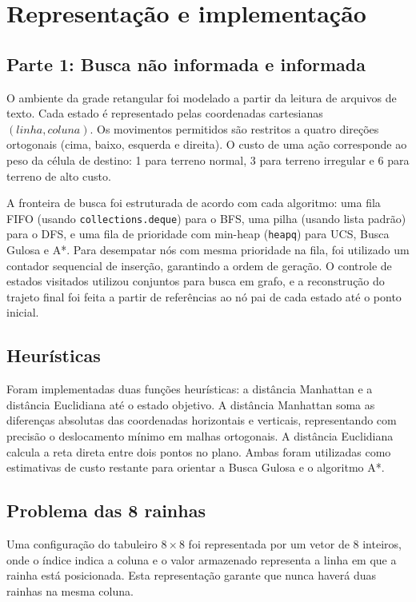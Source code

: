 \documentclass[12pt]{article}
\begin{document}
\section{Representação e implementação}

\subsection{Parte 1: Busca não informada e informada}
O ambiente da grade retangular foi modelado a partir da leitura de arquivos de texto. Cada estado é representado pelas coordenadas cartesianas $(linha, coluna)$. Os movimentos permitidos são restritos a quatro direções ortogonais (cima, baixo, esquerda e direita). O custo de uma ação corresponde ao peso da célula de destino: 1 para terreno normal, 3 para terreno irregular e 6 para terreno de alto custo.

A fronteira de busca foi estruturada de acordo com cada algoritmo: uma fila FIFO (usando \texttt{collections.deque}) para o BFS, uma pilha (usando lista padrão) para o DFS, e uma fila de prioridade com min-heap (\texttt{heapq}) para UCS, Busca Gulosa e A*. Para desempatar nós com mesma prioridade na fila, foi utilizado um contador sequencial de inserção, garantindo a ordem de geração. O controle de estados visitados utilizou conjuntos para busca em grafo, e a reconstrução do trajeto final foi feita a partir de referências ao nó pai de cada estado até o ponto inicial.

\subsection{Heurísticas}
Foram implementadas duas funções heurísticas: a distância Manhattan e a distância Euclidiana até o estado objetivo. A distância Manhattan soma as diferenças absolutas das coordenadas horizontais e verticais, representando com precisão o deslocamento mínimo em malhas ortogonais. A distância Euclidiana calcula a reta direta entre dois pontos no plano. Ambas foram utilizadas como estimativas de custo restante para orientar a Busca Gulosa e o algoritmo A*.

\subsection{Problema das 8 rainhas}
Uma configuração do tabuleiro $8 \times 8$ foi representada por um vetor de 8 inteiros, onde o índice indica a coluna e o valor armazenado representa a linha em que a rainha está posicionada. Esta representação garante que nunca haverá duas rainhas na mesma coluna.
\end{document}

